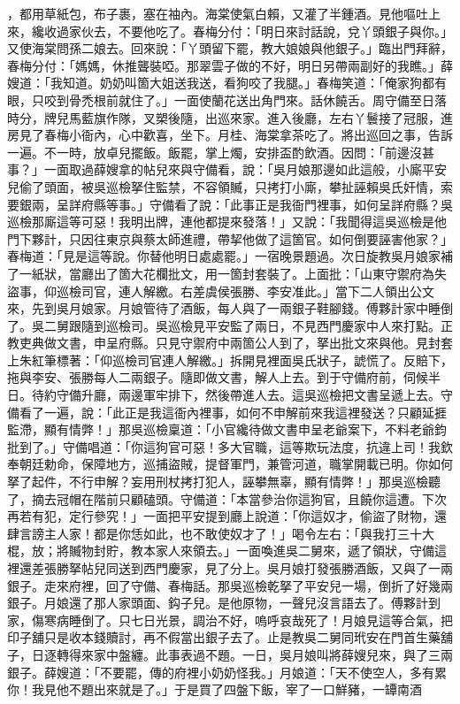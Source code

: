 \begin{showcontents}{}
，都用草紙包，布子裹，塞在袖內。海棠使氣白賴，又灌了半鍾酒。見他嘔吐上來，纔收過家伙去，不要他吃了。春梅分付：「明日來討話說，兌丫頭銀子與你。」又使海棠問孫二娘去。回來說：「丫頭留下罷，教大娘娘與他銀子。」臨出門拜辭，春梅分付：「媽媽，休推聾裝啞。那翠雲子做的不好，明日另帶兩副好的我瞧。」薛嫂道：「我知道。奶奶叫箇大姐送我送，看狗咬了我腿。」春梅笑道：「俺家狗都有眼，只咬到骨禿根前就住了。」一面使蘭花送出角門來。話休饒舌。周守備至日落時分，牌兒馬藍旗作隊，叉槊後隨，出巡來家。進入後廳，左右丫鬟接了冠服，進房見了春梅小衙內，心中歡喜，坐下。月桂、海棠拿茶吃了。將出巡回之事，告訴一遍。不一時，放卓兒擺飯。飯罷，掌上燭，安排盃酌飲酒。因問：「前邊沒甚事？」一面取過薛嫂拿的帖兒來與守備看，說：「吳月娘那邊如此這般，小廝平安兒偷了頭面，被吳巡檢拏住監禁，不容領贓，只拷打小廝，攀扯誣賴吳氏奸情，索要銀兩，呈詳府縣等事。」守備看了說：「此事正是我衙門裡事，如何呈詳府縣？吳巡檢那廝這等可惡！我明出牌，連他都提來發落！」又說：「我聞得這吳巡檢是他門下夥計，只因往東京與蔡太師進禮，帶挈他做了這箇官。如何倒要誣害他家？」春梅道：「見是這等說。你替他明日處處罷。」一宿晚景題過。次日旋教吳月娘家補了一紙狀，當廳出了箇大花欄批文，用一箇封套裝了。上面批：「山東守禦府為失盜事，仰巡檢司官，連人解繳。右差虞侯張勝、李安准此。」當下二人領出公文來，先到吳月娘家。月娘管待了酒飯，每人與了一兩銀子鞋腳錢。傅夥計家中睡倒了。吳二舅跟隨到巡檢司。吳巡檢見平安監了兩日，不見西門慶家中人來打點。正教吏典做文書，申呈府縣。只見守禦府中兩箇公人到了，拏出批文來與他。見封套上朱紅筆標著：「仰巡檢司官連人解繳。」拆開見裡面吳氏狀子，諕慌了。反賠下，拖與李安、張勝每人二兩銀子。隨即做文書，解人上去。到于守備府前，伺候半日。待約守備升廳，兩邊軍牢排下，然後帶進人去。這吳巡檢把文書呈遞上去。守備看了一遍，說：「此正是我這衙內裡事，如何不申解前來我這裡發送？只顧延捱監滯，顯有情弊！」那吳巡檢稟道：「小官纔待做文書申呈老爺案下，不料老爺鈞批到了。」守備唱道：「你這狗官可惡！多大官職，這等欺玩法度，抗違上司！我欽奉朝廷勅命，保障地方，巡捕盜賊，提督軍門，兼管河道，職掌開載已明。你如何拏了起件，不行申解？妄用刑杖拷打犯人，誣攀無辜，顯有情弊！」那吳巡檢聽了，摘去冠帽在階前只顧磕頭。守備道：「本當參治你這狗官，且饒你這遭。下次再若有犯，定行參究！」一面把平安提到廳上說道：「你這奴才，偷盜了財物，還肆言謗主人家！都是你恁如此，也不敢使奴才了！」喝令左右：「與我打三十大棍，放；將贓物封貯，教本家人來領去。」一面喚進吳二舅來，遞了領狀，守備這裡還差張勝拏帖兒同送到西門慶家，見了分上。吳月娘打發張勝酒飯，又與了一兩銀子。走來府裡，回了守備、春梅話。那吳巡檢乾拏了平安兒一場，倒折了好幾兩銀子。月娘還了那人家頭面、鈎子兒。是他原物，一聲兒沒言語去了。傅夥計到家，傷寒病睡倒了。只七日光景，調治不好，嗚呼哀哉死了！月娘見這等合氣，把印子舖只是收本錢贖討，再不假當出銀子去了。止是教吳二舅同玳安在門首生藥舖子，日逐轉得來家中盤纏。此事表過不題。一日，吳月娘叫將薛嫂兒來，與了三兩銀子。薛嫂道：「不要罷，傳的府裡小奶奶怪我。」月娘道：「天不使空人，多有累你！我見他不題出來就是了。」于是買了四盤下飯，宰了一口鮮豬，一罈南酒 
\end{showcontents}

